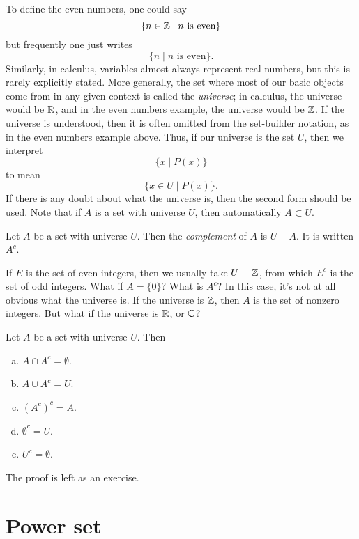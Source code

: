 \documentclass{tufte-book}
\begin{document}
To define the even numbers, one could say
\[
\{n \in \mathbb{Z}  \mid  n \text{ is even}\}
\]
but frequently one just writes
\[
\{n  \mid  n \text{ is even}\}.
\]
Similarly, in calculus, variables almost always represent real numbers, but this is rarely explicitly stated. More generally, the set where most of our basic objects come from in any given context is called the \emph{universe}; in calculus, the universe would be $\mathbb{R}$, and in the even numbers example, the universe would be $\mathbb{Z}$. If the universe is understood, then it is often omitted from the set-builder notation, as in the even numbers example above. Thus, if our universe is the set $U$, then we interpret
\[
\{x  \mid  P(x)\} 
\]
to mean
\[
\{x \in U  \mid  P(x)\}.
\]
If there is any doubt about what the universe is, then the second form should be used. Note that if $A$ is a set with universe $U$, then automatically $A \subset U$.

\begin{definition}
  Let $A$ be a set with universe $U$. Then the \emph{complement} of $A$ is $U - A$. It is written $A^c$.
\end{definition}

If $E$ is the set of even integers, then we usually take $U = \mathbb{Z}$, from which $E^c$ is the set of odd integers. What if $A = \{0\}$? What is $A^c$? In this case, it's not at all obvious what the universe is. If the universe is $\mathbb{Z}$, then $A$ is the set of nonzero integers. But what if the universe is $\mathbb{R}$, or $\mathbb{C}$?

\begin{proposition}\label{prop:complements}
  Let $A$ be a set with universe $U$. Then
  \begin{enumerate}[(a)]
      \item $A \cap A^c = \emptyset$.
      \item $A \cup A^c = U$.
      \item $(A^c)^c = A$.
      \item $\emptyset^c = U$.
      \item $U^c = \emptyset$.
  \end{enumerate}
\end{proposition}

The proof is left as an exercise.



\section{Power set}
\label{sec:power-set}
\end{document}
